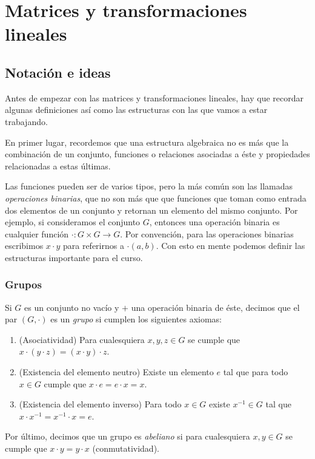 \chapter{Matrices y transformaciones lineales}

\section{Notación e ideas}

Antes de empezar con las matrices y transformaciones lineales, hay que recordar algunas definiciones así como las estructuras con las que vamos a estar trabajando.

En primer lugar, recordemos que una estructura algebraica no es más que la combinación de un conjunto, funciones o relaciones asociadas a éste y propiedades relacionadas a estas últimas.

Las funciones pueden ser de varios tipos, pero la más común son las llamadas \emph{operaciones binarias}, que no son más que que funciones que toman como entrada dos elementos de un conjunto y retornan un elemento del mismo conjunto. Por ejemplo, si consideramos el conjunto $G$, entonces una operación binaria es cualquier función $\cdot \colon  G \times G \to G$. Por convención, para las operaciones binarias escribimos $x \cdot y$  para referirnos a $\cdot(a,b)$. Con esto en mente podemos definir las estructuras importante para el curso.

\subsection{Grupos}

\begin{defi}
  Si $G$ es un conjunto no vacío y $+$ una operación binaria de éste, decimos que el par $(G, \cdot)$ es un \emph{grupo} si cumplen los siguientes axiomas:
  \begin{enumerate}
    \item (Asociatividad) Para cualesquiera $x, y, z \in G$ se cumple que $x\cdot(y\cdot z) = (x\cdot y)\cdot z$.
    \item (Existencia del elemento neutro) Existe un elemento $e$ tal que para todo $x \in G$ cumple que $x\cdot e = e\cdot x = x$.
    \item (Existencia del elemento inverso) Para todo $x \in G$ existe $x^{-1} \in G$ tal que $x\cdot x^{-1} = x^{-1}\cdot x = e$.
  \end{enumerate}

  Por último, decimos que un grupo es \emph{abeliano} si para cualesquiera $x,y \in G$ se cumple que $x\cdot y = y \cdot x$ (conmutatividad).
\end{defi}

